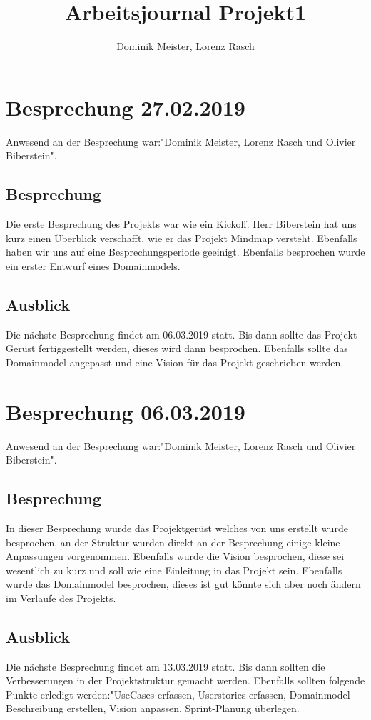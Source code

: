 \documentclass[a4paper,parskip]{scrartcl}
\title{Arbeitsjournal Projekt1}
\author{Dominik Meister, Lorenz Rasch}
\begin{document}
\maketitle
\section{Besprechung 27.02.2019}
Anwesend an der Besprechung war:"Dominik Meister, Lorenz Rasch und Olivier Biberstein". 
\subsection{Besprechung}
Die erste Besprechung des Projekts war wie ein Kickoff. Herr Biberstein hat uns kurz einen
Überblick verschafft, wie er das Projekt Mindmap versteht. Ebenfalls haben wir uns auf eine Besprechungsperiode geeinigt. Ebenfalls besprochen wurde ein erster Entwurf eines Domainmodels.
\subsection{Ausblick}
Die nächste Besprechung findet am 06.03.2019 statt. Bis dann sollte das Projekt Gerüst fertiggestellt werden, dieses wird dann besprochen. Ebenfalls sollte das Domainmodel angepasst und eine Vision für das Projekt geschrieben werden.

\section{Besprechung 06.03.2019}
Anwesend an der Besprechung war:"Dominik Meister, Lorenz Rasch und Olivier Biberstein". 
\subsection{Besprechung}
In dieser Besprechung wurde das Projektgerüst welches von uns erstellt wurde besprochen, an der Struktur wurden direkt an der Besprechung einige kleine Anpassungen vorgenommen. Ebenfalls wurde die Vision besprochen, diese sei wesentlich zu kurz und soll wie eine Einleitung in das Projekt sein. Ebenfalls wurde das Domainmodel besprochen, dieses ist gut könnte sich aber noch ändern im Verlaufe des Projekts.
\subsection{Ausblick}
Die nächste Besprechung findet am 13.03.2019 statt. Bis dann sollten die Verbesserungen in der Projektstruktur gemacht werden. Ebenfalls sollten folgende Punkte erledigt werden:"UseCases erfassen, Userstories erfassen, Domainmodel Beschreibung erstellen, Vision anpassen, Sprint-Planung überlegen.
\end{document}

